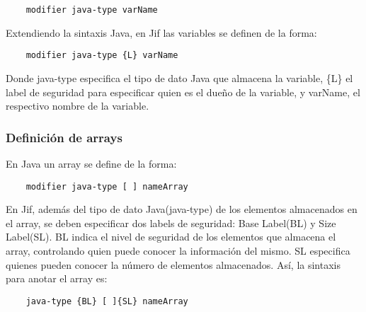 \begin{lstlisting}
	modifier java-type varName
\end{lstlisting}
Extendiendo la sintaxis Java, en Jif las variables se definen de la forma:
\begin{lstlisting}
	modifier java-type {L} varName
\end{lstlisting}
Donde java-type especifica el tipo de dato Java que almacena la variable, \{L\}
el label de seguridad  para especificar quien es el dueño de la variable, y
varName, el respectivo nombre de la variable.

\subsubsection{Definición de arrays}
En Java un array se define de la forma:
\begin{lstlisting}
	modifier java-type [ ] nameArray
\end{lstlisting}
En Jif, además del tipo de dato Java(java-type) de los elementos almacenados en
el array, se deben especificar dos labels de seguridad: Base Label(BL) y Size
Label(SL). BL indica el nivel de seguridad de los elementos que almacena el
array, controlando quien puede conocer la información del mismo. SL especifica
quienes pueden conocer la número de elementos almacenados. Así, la sintaxis para
anotar el array es:
\begin{lstlisting}
	java-type {BL} [ ]{SL} nameArray
\end{lstlisting}


